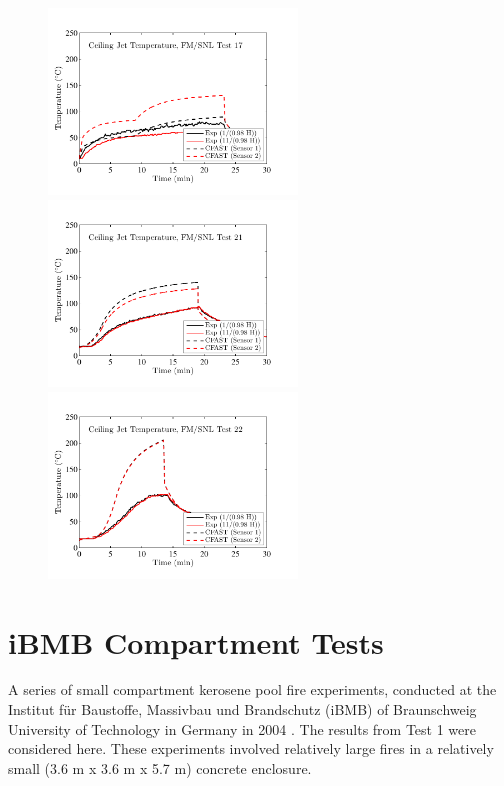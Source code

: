 \begin{figure}[p]
\begin{center}
\includegraphics[width=2.6in]{FIGURES/FM_SNL/FM_SNL_17_Ceiling_Jet} \\
\includegraphics[width=2.6in]{FIGURES/FM_SNL/FM_SNL_21_Ceiling_Jet} \\
\includegraphics[width=2.6in]{FIGURES/FM_SNL/FM_SNL_22_Ceiling_Jet} 
\end{center}
\end{figure}

\clearpage

\section{iBMB Compartment Tests}

A series of small compartment kerosene pool fire experiments, conducted at the
Institut f\"ur Baustoffe, Massivbau und Brandschutz (iBMB) of Braunschweig University of
Technology in Germany in 2004 \cite{Klein-Helbetaling:2005}.  The results from Test 1 were
considered here.  These experiments involved relatively large fires in a relatively small (3.6 m x 3.6 m x 5.7 m) concrete enclosure. 

